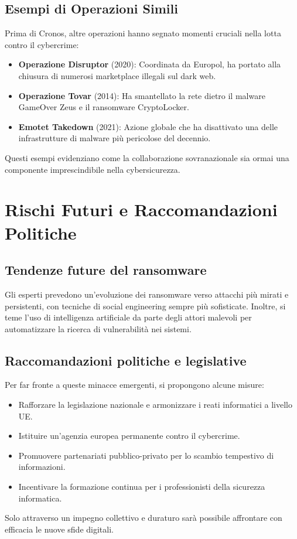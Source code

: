 \documentclass[a4paper,12pt]{article}
\begin{document}
\subsection{Esempi di Operazioni Simili}
Prima di Cronos, altre operazioni hanno segnato momenti cruciali nella lotta contro il cybercrime:
\begin{itemize}
    \item \textbf{Operazione Disruptor} (2020): Coordinata da Europol, ha portato alla chiusura di numerosi marketplace illegali sul dark web.
    \item \textbf{Operazione Tovar} (2014): Ha smantellato la rete dietro il malware GameOver Zeus e il ransomware CryptoLocker.
    \item \textbf{Emotet Takedown} (2021): Azione globale che ha disattivato una delle infrastrutture di malware più pericolose del decennio.
\end{itemize}
Questi esempi evidenziano come la collaborazione sovranazionale sia ormai una componente imprescindibile nella cybersicurezza.

\section{Rischi Futuri e Raccomandazioni Politiche}
\subsection{Tendenze future del ransomware}
Gli esperti prevedono un’evoluzione dei ransomware verso attacchi più mirati e persistenti, con tecniche di social engineering sempre più sofisticate. Inoltre, si teme l’uso di intelligenza artificiale da parte degli attori malevoli per automatizzare la ricerca di vulnerabilità nei sistemi.

\subsection{Raccomandazioni politiche e legislative}
Per far fronte a queste minacce emergenti, si propongono alcune misure:
\begin{itemize}
    \item Rafforzare la legislazione nazionale e armonizzare i reati informatici a livello UE.
    \item Istituire un’agenzia europea permanente contro il cybercrime.
    \item Promuovere partenariati pubblico-privato per lo scambio tempestivo di informazioni.
    \item Incentivare la formazione continua per i professionisti della sicurezza informatica.
\end{itemize}
Solo attraverso un impegno collettivo e duraturo sarà possibile affrontare con efficacia le nuove sfide digitali.
\end{document}

